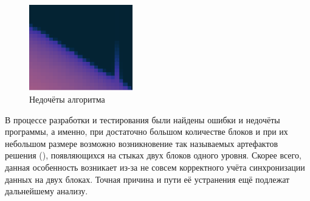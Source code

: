 \begin{figure}
    \begin{center}
        \includegraphics[width=0.4\textwidth, height=0.4\textheight, keepaspectratio]{Теория_блочных_локально_адаптивных_сеток/Результаты_моделирования/artifact.png}
    \end{center}
    \caption{Недочёты алгоритма}
    \label{fig:artifacts}
\end{figure}
В процессе разработки и тестирования были найдены ошибки и недочёты программы, а именно, при достаточно большом количестве блоков и при их небольшом размере возможно возникновение так называемых артефактов решения (), появляющихся на стыках двух блоков одного уровня.
Скорее всего, данная особенность возникает из-за не совсем корректного учёта синхронизации данных на двух блоках.
Точная причина и пути её устранения ещё подлежат дальнейшему анализу.